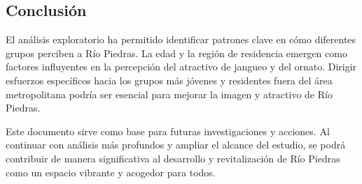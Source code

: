 \documentclass[11pt]{article}
\begin{document}
\subsection{Conclusión}

El análisis exploratorio ha permitido identificar patrones clave en cómo diferentes grupos perciben a Río Piedras. La edad y la región de residencia emergen como factores influyentes en la percepción del atractivo de jangueo y del ornato. Dirigir esfuerzos específicos hacia los grupos más jóvenes y residentes fuera del área metropolitana podría ser esencial para mejorar la imagen y atractivo de Río Piedras.

Este documento sirve como base para futuras investigaciones y acciones. Al continuar con análisis más profundos y ampliar el alcance del estudio, se podrá contribuir de manera significativa al desarrollo y revitalización de Río Piedras como un espacio vibrante y acogedor para todos.
\end{document}
